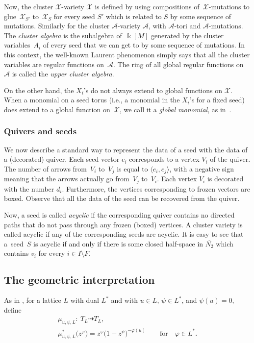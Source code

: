 \documentclass[10pt,a4paper]{amsart}
\numberwithin{equation}{section}
\numberwithin{figure}{section}
\numberwithin{table}{section}
\let\?=\overline
\let\s=\mathcal
\newcommand {\kk} {\Bbbk}
\theoremstyle{definition}
\begin{document}
Now, the cluster $\s{X}$-variety $\s{X}$ is defined by using compositions of~$\s{X}$-mutations to glue~$\s{X}_{S'}$ to~$\s{X}_S$ for every seed $S'$ which is related to $S$ by some sequence of mutations. Similarly for the cluster $\s{A}$-variety $\s{A}$, with $\s{A}$-tori and $\s{A}$-mutations. The {\it cluster algebra} is the subalgebra of~$\kk[M]$ generated by the cluster variables~$A_i$ of every seed that we can get to by some sequence of mutations. In this context, the well-known Laurent phenomenon simply says that all the cluster variables are regular functions on~$\s{A}$. The ring of all global regular functions on~$\s{A}$ is called the {\it upper cluster algebra}.

On the other hand, the $X_i$'s do not always extend to global functions on $\s{X}$. When a monomial on a seed torus (i.e., a monomial in the $X_i$'s for a fixed seed) does extend to a global function on~$\s{X}$, we call it a {\it global monomial}, as in~\cite{GHK3}.

\subsubsection{Quivers and seeds}\label{quivers}

We now describe a standard way to represent the data of a seed with the data of a (decorated) quiver. Each seed vector $e_i$ corresponds to a vertex $V_i$ of the quiver. The number of arrows from~$V_i$ to~$V_j$ is equal to $\langle e_i , e_j\rangle$, with a negative sign meaning that the arrows actually go from~$V_j$ to~$V_i$. Each vertex $V_i$ is decorated with the number $d_i$. Furthermore, the vertices corresponding to frozen vectors are boxed. Observe that all the data of the seed can be recovered from the quiver.

Now, a seed is called {\it acyclic} if the corresponding quiver contains no directed paths that do not pass through any frozen (boxed) vertices. A cluster variety is called acyclic if any of the corresponding seeds are acyclic. It is easy to see that a~seed~$S$ is acyclic if and only if there is some closed half-space in $\?{N_2}$ which contains $v_i$ for every $i\in I\setminus F$.

\subsection{The geometric interpretation}\label{geom int}

As in \cite{GHK3}, for a lattice $L$ with dual $L^*$ and with $u \in L$, $\psi \in L^*$, and $\psi(u)=0$, define
\begin{gather*}
	\mu_{u,\psi,L}\colon \ T_L \dashrightarrow T_L, \\
	\mu_{u,\psi,L}^*\big(z^{\varphi}\big) = z^\varphi\big(1+z^{\psi}\big)^{-\varphi(u)} \qquad \text{for} \quad \varphi\in L^*.
\end{gather*}
\end{document}
